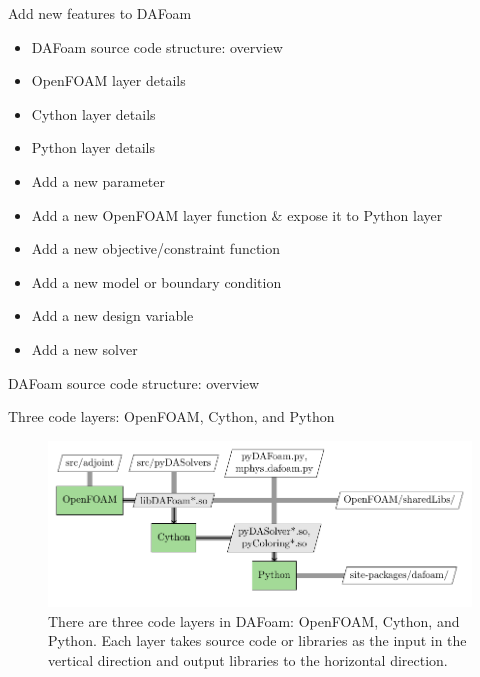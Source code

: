 \documentclass{bredelebeamer}
\begin{document}
\begin{frame}{}
  \center \Large Add new features to DAFoam
  \normalsize
  \begin{itemize}
    \setlength\itemsep{1em}
    \item DAFoam source code structure: overview
    \item OpenFOAM layer details
    \item Cython layer details
    \item Python layer details
    \item Add a new parameter
    \item Add a new OpenFOAM layer function \& expose it to Python layer
    \item Add a new objective/constraint function
    \item Add a new model or boundary condition
    \item Add a new design variable
    \item Add a new solver
  \end{itemize}
\end{frame}

\begin{frame}{}
  \center \Large DAFoam source code structure: overview
\end{frame}

\begin{frame}{Three code layers: OpenFOAM, Cython, and Python}
\begin{figure}
\includegraphics[width=1.05\linewidth]{images/dafoam_layers.pdf} 
\caption{There are three code layers in DAFoam: OpenFOAM, Cython, and Python. Each layer takes source code or libraries as the input in the vertical direction and output libraries to the horizontal direction.}
\end{figure}
\end{frame}
\end{document}
